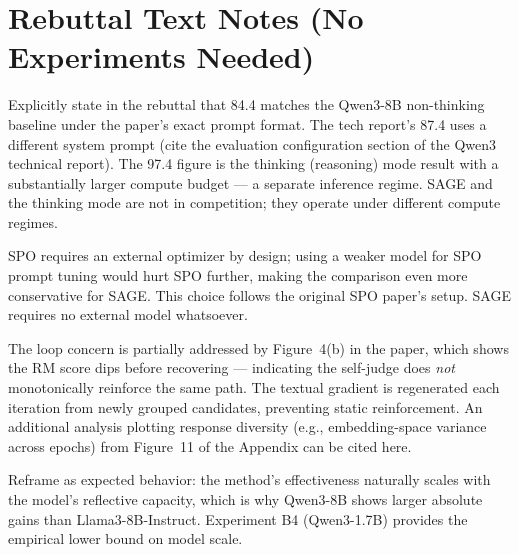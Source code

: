 \documentclass[11pt,a4paper]{article}
\newcommand{\rev}[1]{\texttt{\textbf{#1}}}
\begin{document}
\section{Rebuttal Text Notes (No Experiments Needed)}

\begin{description}[leftmargin=2cm, style=nextline]
  \item[\rev{pDvu}-W1 (Baseline discrepancy)]
    Explicitly state in the rebuttal that 84.4 matches the Qwen3-8B non-thinking baseline
    under the paper's exact prompt format. The tech report's 87.4 uses a different system
    prompt (cite the evaluation configuration section of the Qwen3 technical report). The 97.4
    figure is the thinking (reasoning) mode result with a substantially larger compute budget ---
    a separate inference regime. SAGE and the thinking mode are not in competition; they operate
    under different compute regimes.

  \item[\rev{RD4w}-Q1 (GPT-4.1 for SPO)]
    SPO requires an external optimizer by design; using a weaker model for SPO prompt tuning
    would hurt SPO further, making the comparison even more conservative for SAGE. This choice
    follows the original SPO paper's setup. SAGE requires no external model whatsoever.

  \item[\rev{aHH9}-Q3 (Self-congratulatory loop)]
    The loop concern is partially addressed by Figure~4(b) in the paper, which shows the RM
    score dips before recovering --- indicating the self-judge does \emph{not} monotonically
    reinforce the same path. The textual gradient is regenerated each iteration from newly
    grouped candidates, preventing static reinforcement. An additional analysis plotting
    response diversity (e.g., embedding-space variance across epochs) from Figure~11 of the
    Appendix can be cited here.

  \item[\rev{aHH9}-W3 (Reflection ability varies)]
    Reframe as expected behavior: the method's effectiveness naturally scales with the model's
    reflective capacity, which is why Qwen3-8B shows larger absolute gains than Llama3-8B-Instruct.
    Experiment B4 (Qwen3-1.7B) provides the empirical lower bound on model scale.
\end{description}
\end{document}
